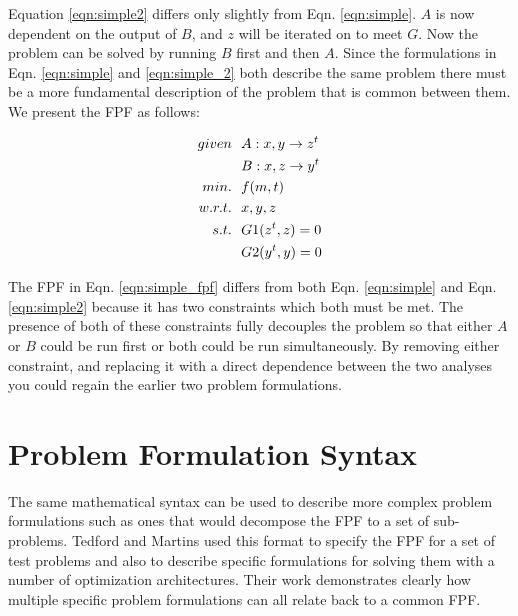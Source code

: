     Equation \ref{eqn:simple2} differs only slightly from Eqn. \ref{eqn:simple}. $A$ is now dependent on the output of $B$, 
    and $z$ will be iterated on to meet $G$. Now the problem can be solved by running $B$ first and then $A$.
    Since the formulations in Eqn. \ref{eqn:simple} and \ref{eqn:simple_2} both describe the same problem 
    there must be a more fundamental description of the problem that is common between them. We present the FPF as follows: 

    \begin{align}
        given & \ \ A: {x,y} \rightarrow {z^t}
        \\      & \ \ B: {x,z} \rightarrow {y^t}
        \\min. &\ \ f(m,t) \notag
        \\w.r.t. & \ \ x,y,z \notag
        \\s.t. & \ \ G1(z^t,z) = 0 \notag
        \\     & \ \ G2(y^t,y) = 0
        \label{eqn:simple_fpf}
    \end{align}

    The FPF in Eqn. \ref{eqn:simple_fpf} differs from both Eqn. \ref{eqn:simple} and Eqn. \ref{eqn:simple2} because it has 
    two constraints which both must be met. The presence of both of these constraints fully decouples the problem so that 
    either $A$ or $B$ could be run first or both could be run simultaneously. By removing either constraint, and replacing 
    it with a direct dependence between the two analyses you could regain the earlier two problem formulations. 

    \section{Problem Formulation Syntax}

    The same mathematical syntax can be used to describe more complex problem formulations
    such as ones that would decompose the FPF to a set of sub-problems. Tedford and Martins used this format to specify the 
    FPF for a set of test problems and also to describe specific formulations for solving them with a 
    number of optimization architectures\cite{Tedford2009}. Their work demonstrates clearly how multiple specific 
    problem formulations can all relate back to a common FPF. 

